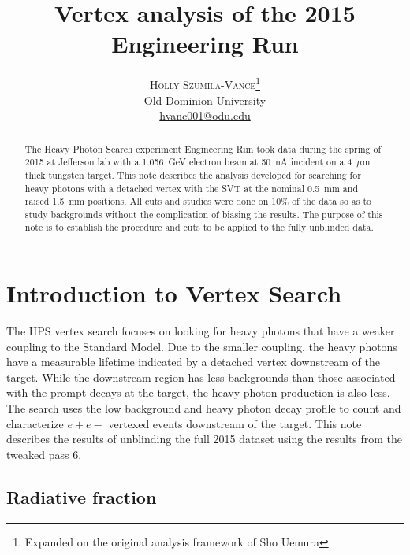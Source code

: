 \documentclass[twoside]{article}
\title{\vspace{-15mm}\fontsize{20pt}{10pt}\selectfont\textbf{Vertex analysis of the 2015 Engineering Run}} %
\author{
\large
\textsc{Holly Szumila-Vance}\thanks{Expanded on the original analysis framework of Sho Uemura}\\[2mm] %
\normalsize Old Dominion University \\ %
\normalsize \href{mailto:hvanc001@odu.edu}{hvanc001@odu.edu} %
\vspace{-5mm}
}
\date{}
\begin{document}
\maketitle %

\thispagestyle{fancy} %


\begin{abstract}

The Heavy Photon Search experiment Engineering Run took data during the spring of 2015 at Jefferson lab with a 1.056~GeV electron beam at 50~nA incident on a 4~$\mu$m thick tungsten target. This note describes the analysis developed for searching for heavy photons with a detached vertex with the SVT at the nominal 0.5~mm and raised 1.5~mm positions. All cuts and studies were done on 10$\%$ of the data so as to study backgrounds without the complication of biasing the results. The purpose of this note is to establish the procedure and cuts to be applied to the fully unblinded data.  


\end{abstract}
\newpage
\tableofcontents
 \newpage
\listoftables
\newpage


\section{Introduction to Vertex Search}

The HPS vertex search focuses on looking for heavy photons that have a weaker coupling to the Standard Model. Due to the smaller coupling, the heavy photons have a measurable lifetime indicated by a detached vertex downstream of the target. While the downstream region has less backgrounds than those associated with the prompt decays at the target, the heavy photon production is also less. The search uses the low background and heavy photon decay profile to count and characterize $e+e-$ vertexed events downstream of the target. This note describes the results of unblinding the full 2015 dataset using the results from the tweaked pass 6. 

\subsection{Radiative fraction}
\end{document}
